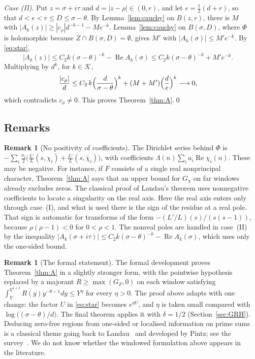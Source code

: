 \documentclass[11pt]{amsart}
\newcommand{\re}{\operatorname{Re}}
\theoremstyle{plain}
\theoremstyle{definition}
\newtheorem{remark}[theorem]{Remark}
\numberwithin{equation}{section}
\begin{document}
\emph{Case (II).} Put $z=\sigma+i\tau$ and $d=|z-\rho|\in(0,r)$, and let $e=\frac12(d+r)$, so that
$d<e<r\le D\le\sigma-\theta$. By Lemma~\ref{lem:cauchy} on $B(z,r)$, there is $M$ with
$|A_k(z)|\ge|c_\rho|d^{-k-1}-Me^{-k}$. Lemma~\ref{lem:cauchy} on $B(\sigma,D)$, where $\Phi$ is
holomorphic because $Z\cap B(\sigma,D)=\emptyset$, gives $M'$ with $|A_k(\sigma)|\le M'e^{-k}$. By
\eqref{eq:star},
\[
|A_k(z)|\le C_2k(\sigma-\theta)^{-k}-\re A_k(\sigma)\le C_2k(\sigma-\theta)^{-k}+M'e^{-k}.
\]
Multiplying by $d^{k}$, for $k\in\mathcal K$,
\[
\frac{|c_\rho|}{d}\le C_2\,k\Bigl(\frac{d}{\sigma-\theta}\Bigr)^k+(M+M')\Bigl(\frac de\Bigr)^k\longrightarrow0,
\]
which contradicts $c_\rho\neq0$. This proves Theorem~\ref{thm:A}.\qed

\subsection{Remarks}

\begin{remark}[No positivity of coefficients]\label{rem:nopositivity}
The Dirichlet series behind $\Phi$ is $-\sum_i\frac{a_i}{2}\bigl(\frac{L'}{L}(s,\chi_i)+\frac{L'}{L}(s,\bar\chi_i)\bigr)$,
with coefficients $\Lambda(n)\sum_ia_i\re\chi_i(n)$. These may be negative. For instance, if $F$
consists of a single real nonprincipal character, Theorem~\ref{thm:A} says that an upper bound for
$G_\chi$ on far windows already excludes zeros. The classical proof of Landau's theorem uses
nonnegative coefficients to locate a singularity on the real axis. Here the real axis enters only
through case~(I), and what is used there is the sign of the residue at a real pole. That sign is
automatic for transforms of the form $-(L'/L)(s)/(s(s-1))$, because $\rho(\rho-1)<0$ for
$0<\rho<1$. The nonreal poles are handled in case~(II) by the inequality
$|A_k(\sigma+i\tau)|\le C_2k(\sigma-\theta)^{-k}-\re A_k(\sigma)$, which uses only the one-sided
bound.
\end{remark}

\begin{remark}[The formal statement]\label{rem:Aformal}
The formal development proves Theorem~\ref{thm:A} in a slightly stronger form, with the pointwise
hypothesis replaced by a majorant $R\ge\max(G_F,0)$ on each window satisfying
$\int_Y^{Y^{1+\delta}}R(y)y^{-\theta-1}dy\le Y^{\eta}$ for every $\eta>0$. The proof above adapts
with one change: the factor $U$ in \eqref{eq:star} becomes $e^{\eta U}$, and $\eta$ is taken small
compared with $\log\bigl((\sigma-\theta)/d\bigr)$. The final theorem applies it with $\delta=1/2$ (Section~\ref{sec:GRH}). Deducing
zero-free regions from one-sided or localised information on prime sums is a classical theme going
back to Landau~\cite{landau} and developed by Pintz; see the survey~\cite{johnston-trudgian}. We do
not know whether the windowed formulation above appears in the literature.
\end{remark}
\end{document}
